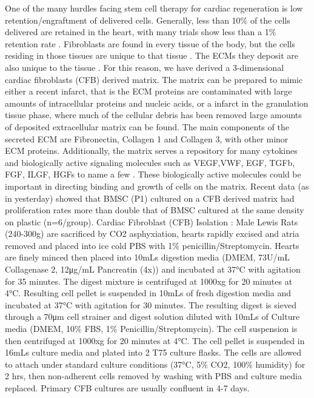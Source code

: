 \begin{outline}
\1 One of the many hurdles facing stem cell therapy for cardiac regeneration is low retention/engraftment of delivered cells.  Generally, less than 10\% of the cells delivered are retained in the heart, with many trials show less than a 1\% retention rate \cite{Freyman:2006nx,Ly:2009cr,Menasche:2010dq,Terrovitis:2009oq,Hofmann:2005tw}. 
\1 Fibroblasts are found in every tissue of the body, but the cells residing in those tissues are unique to that tissue \cite{Chang:2002ij,Fries:1994tg,Lekic:1997hc,Souders:2009kl}.  The ECMs they deposit are also unique to the tissue \cite{Chang:2002ij,Fries:1994tg,Lekic:1997hc,Souders:2009kl}.  For this reason, we have derived a 3-dimensional cardiac fibroblasts (CFB) derived matrix.  The matrix can be prepared to mimic either a recent infarct, that is the ECM proteins are contaminated with large amounts of intracellular proteins and nucleic acids, or a infarct in the granulation tissue phase, where much of the cellular debris has been removed large amounts of deposited extracellular matrix can be found.  The main components of the secreted ECM are Fibronectin, Collagen 1 and Collagen 3, with other minor ECM proteins.  Additionally, the matrix serves a repository for many cytokines and biologically active signaling molecules such as VEGF,VWF, EGF, TGFb, FGF, ILGF, HGFs to name a few \cite{Franitza:2000fu,Hynes:2009bs,Iyer:2008fv,Vaday:2000kl,Vaday:2000dz}.  These biologically active molecules could be important in directing binding and growth of cells on the matrix.  Recent data (as in yesterday) showed that BMSC (P1) cultured on a CFB derived matrix had proliferation rates more than double that of BMSC cultured at the same density on plastic (n=6/group).
\1 Cardiac Fibroblast (CFB) Isolation \cite{Baharvand:2005mi,Dubey:1997qa}:
\2 Male Lewis Rats (240-300g) are sacrificed by CO2 asphyxiation, hearts rapidly excised and atria removed and placed into ice cold PBS with 1\% penicillin/Streptomycin.  Hearts are finely minced then placed into 10mLs digestion media (DMEM, 73U/mL Collagenase 2, 12μg/mL Pancreatin (4x)) and incubated at 37°C with agitation for 35 minutes.  The digest mixture is centrifuged at 1000xg for 20 minutes at 4°C.  Resulting cell pellet is suspended in 10mLs of fresh digestion media and incubated at 37°C with agitation for 30 minutes.  The resulting digest is sieved through a 70μm cell strainer and digest solution diluted with 10mLs of Culture media (DMEM, 10\% FBS, 1\% Penicillin/Streptomycin).  The cell suspension is then centrifuged at 1000xg for 20 minutes at 4°C.  The cell pellet is suspended in 16mLs culture media and plated into 2 T75 culture flasks.  The cells are allowed to attach under standard culture conditions (37°C, 5\% CO2, 100\% humidity) for 2 hrs, then non-adherent cells removed by washing with PBS and culture media replaced. Primary CFB cultures are usually confluent in 4-7 days.

\end{outline}
